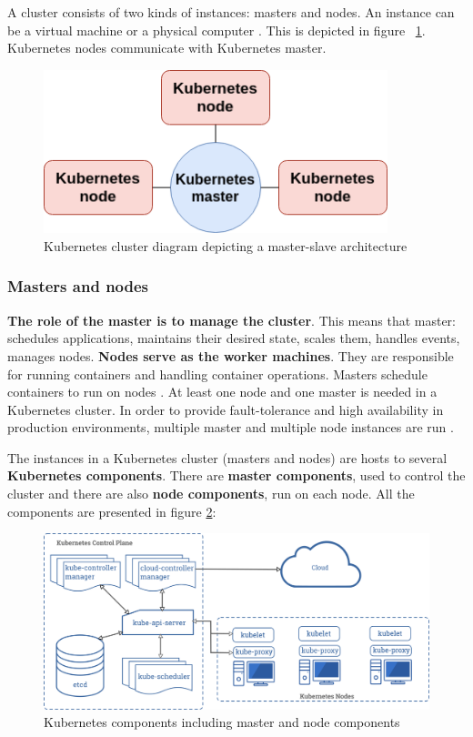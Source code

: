 A cluster consists of two kinds of instances: masters and nodes. An instance can be a virtual machine or a physical computer \cite{article-k8s-as-avail,k8s-cluster}. This is depicted in figure ~\ref{fig:cluster-k8s}. Kubernetes nodes communicate with Kubernetes master.
\begin{figure}[H]
    \centering
    \includegraphics[width=10cm]{figures/cluster-k8s.png}
    \caption{Kubernetes cluster diagram depicting a master-slave architecture}
    \label{fig:cluster-k8s}
\end{figure}

\subsubsection{Masters and nodes}
\textbf{The role of the master is to manage the cluster}. This means that master: schedules applications, maintains their desired state, scales them, handles events, manages nodes. \textbf{Nodes serve as the worker machines}. They are responsible for running containers and handling container operations. Masters schedule containers to run on nodes \cite{book-mastering-k8s, k8s-cluster}. At least one node and one master is needed in a Kubernetes cluster. In order to provide fault-tolerance and high availability in production environments, multiple master and multiple node instances are run \cite{k8s-components}.

The instances in a Kubernetes cluster (masters and nodes) are hosts to several \textbf{Kubernetes components}. There are \textbf{master components}, used to control the cluster and there are also \textbf{node components}, run on each node. All the components are presented in figure \ref{fig:components-of-kubernetes}:
\begin{figure}[H]
    \centering
    \includegraphics[width=14cm]{figures/components-of-kubernetes.png}
    \caption{Kubernetes components including master and node components \cite{k8s-components}}
    \label{fig:components-of-kubernetes}
\end{figure}


